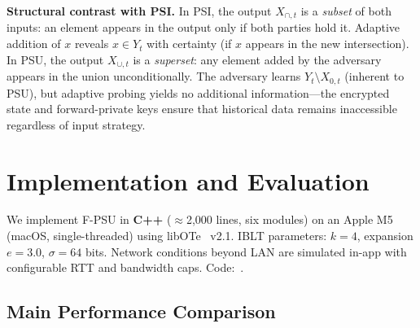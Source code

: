 \documentclass[letterpaper,twocolumn,10pt]{article}
\theoremstyle{definition}
\begin{document}
\smallskip\noindent\textbf{Structural contrast with PSI.}
In PSI, the output $X_{\cap,t}$ is a \emph{subset} of both inputs: an element
appears in the output only if both parties hold it. Adaptive addition of $x$
reveals $x \in Y_t$ with certainty (if $x$ appears in the new intersection).
In PSU, the output $X_{\cup,t}$ is a \emph{superset}: any element added by the
adversary appears in the union unconditionally. The adversary learns
$Y_t \setminus X_{0,t}$ (inherent to PSU), but adaptive probing yields no
additional information---the encrypted state and forward-private keys ensure
that historical data remains inaccessible regardless of input strategy.

\section{Implementation and Evaluation}
\label{sec:eval}

We implement F-PSU in \textbf{C++} ($\approx$2,000 lines, six modules) on an
Apple M5 (macOS, single-threaded) using libOTe~\cite{libOTe} v2.1. IBLT
parameters: $k = 4$, expansion $e = 3.0$, $\sigma = 64$ bits. Network
conditions beyond LAN are simulated in-app with configurable RTT and bandwidth
caps. Code:~\cite{code}.

\subsection{Main Performance Comparison}
\end{document}

